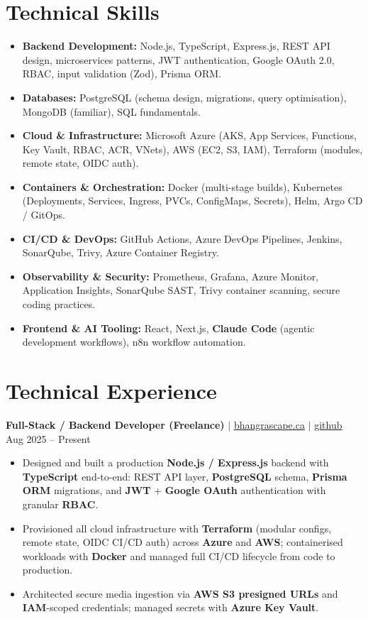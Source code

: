 \documentclass[11pt,a4paper]{article}
\begin{document}
\section{Technical Skills}
\begin{itemize}
    \item \textbf{Backend Development:} Node.js, TypeScript, Express.js, REST API design, microservices patterns, JWT authentication, Google OAuth 2.0, RBAC, input validation (Zod), Prisma ORM.
    \item \textbf{Databases:} PostgreSQL (schema design, migrations, query optimisation), MongoDB (familiar), SQL fundamentals.
    \item \textbf{Cloud \& Infrastructure:} Microsoft Azure (AKS, App Services, Functions, Key Vault, RBAC, ACR, VNets), AWS (EC2, S3, IAM), Terraform (modules, remote state, OIDC auth).
    \item \textbf{Containers \& Orchestration:} Docker (multi-stage builds), Kubernetes (Deployments, Services, Ingress, PVCs, ConfigMaps, Secrets), Helm, Argo CD / GitOps.
    \item \textbf{CI/CD \& DevOps:} GitHub Actions, Azure DevOps Pipelines, Jenkins, SonarQube, Trivy, Azure Container Registry.
    \item \textbf{Observability \& Security:} Prometheus, Grafana, Azure Monitor, Application Insights, SonarQube SAST, Trivy container scanning, secure coding practices.
    \item \textbf{Frontend \& AI Tooling:} React, Next.js, \textbf{Claude Code} (agentic development workflows), n8n workflow automation.
\end{itemize}

\section{Technical Experience}

\textbf{Full-Stack / Backend Developer (Freelance)} $|$ \href{https://bhangrascape.ca}{bhangrascape.ca} $|$ \href{https://github.com/bhat0155/bhangraescape}{\small github} \hfill Aug 2025 -- Present
\begin{itemize}
    \item Designed and built a production \textbf{Node.js / Express.js} backend with \textbf{TypeScript} end-to-end: REST API layer, \textbf{PostgreSQL} schema, \textbf{Prisma ORM} migrations, and \textbf{JWT} + \textbf{Google OAuth} authentication with granular \textbf{RBAC}.
    \item Provisioned all cloud infrastructure with \textbf{Terraform} (modular configs, remote state, OIDC CI/CD auth) across \textbf{Azure} and \textbf{AWS}; containerised workloads with \textbf{Docker} and managed full CI/CD lifecycle from code to production.
    \item Architected secure media ingestion via \textbf{AWS S3 presigned URLs} and \textbf{IAM}-scoped credentials; managed secrets with \textbf{Azure Key Vault}.
\end{itemize}
\end{document}
